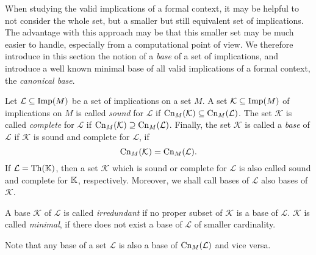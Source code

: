 When studying the valid implications of a formal context, it may be helpful to not
consider the whole set, but a smaller but still equivalent set of implications.  The
advantage with this approach may be that this smaller set may be much easier to handle,
especially from a computational point of view.  We therefore introduce in this section the
notion of a \emph{base} of a set of implications, and introduce a well known minimal base
of all valid implications of a formal context, the \emph{canonical base}.

\begin{Definition}
  \label{def:sound-complete-base}
  Let $\mathcal{L} \subseteq \operatorname{Imp}(M)$ be a set of implications on a set $M$.  A set
  $\mathcal{K} \subseteq \operatorname{Imp}(M)$ of implications on $M$ is called \emph{sound} for
  $\mathcal{L}$ if $\operatorname{Cn}_M(\mathcal{K}) \subseteq \operatorname{Cn}_M(\mathcal{L})$.  The set
  $\mathcal{K}$ is called \emph{complete} for $\mathcal{L}$ if $\operatorname{Cn}_M(\mathcal{K})
  \supseteq \operatorname{Cn}_M(\mathcal{L})$.  Finally, the set $\mathcal{K}$ is called a
  \emph{base} of $\mathcal{L}$ if $\mathcal{K}$ is sound and complete for $\mathcal{L}$,
  \ie if
  \begin{equation}
    \label{eq:8}
    \operatorname{Cn}_M(\mathcal{K}) = \operatorname{Cn}_M(\mathcal{L}).
  \end{equation}
  If $\mathcal{L} = \operatorname{Th}({\mathbb{K}})$, then a set $\mathcal{K}$ which is sound or complete for
  $\mathcal{L}$ is also called sound and complete for ${\mathbb{K}}$, respectively.  Moreover,
  we shall call bases of $\mathcal{L}$ also bases of $\mathcal{K}$.

  A base $\mathcal{K}$ of $\mathcal{L}$ is called \emph{irredundant} if no proper subset
  of $\mathcal{K}$ is a base of $\mathcal{L}$.  $\mathcal{K}$ is called \emph{minimal}, if
  there does not exist a base of $\mathcal{L}$ of smaller cardinality.
\end{Definition}

Note that any base of a set $\mathcal{L}$ is also a base of $\operatorname{Cn}_M(\mathcal{L})$ and vice
versa.

